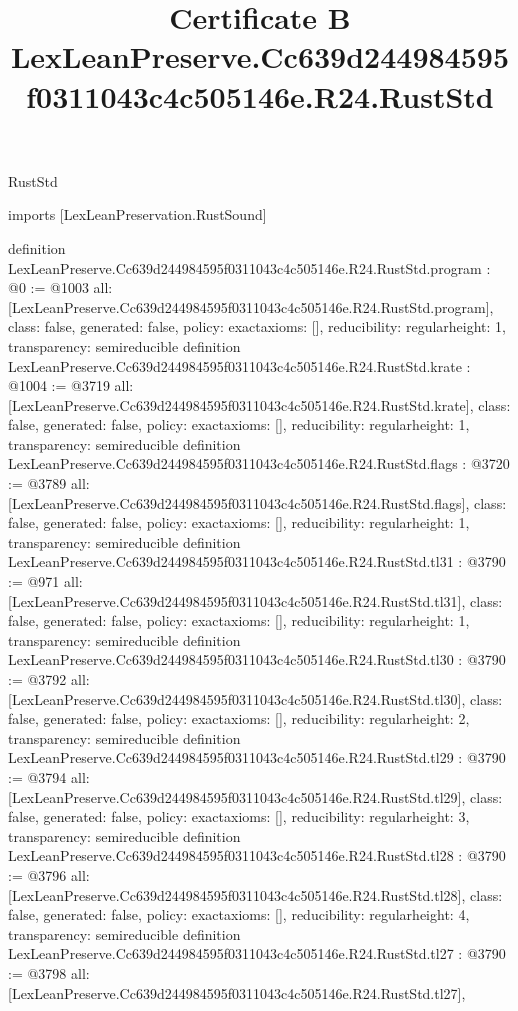 \begin{lexlean}{RustStd}
\title{Certificate B LexLeanPreserve.Cc639d244984595f0311043c4c505146e.R24.RustStd}
\begin{coremodule}
imports [LexLeanPreservation.RustSound]

definition LexLeanPreserve.Cc639d244984595f0311043c4c505146e.R24.RustStd.program : @0 := @1003 {
  all: [LexLeanPreserve.Cc639d244984595f0311043c4c505146e.R24.RustStd.program],
  class: false,
  generated: false,
  policy: exact{axioms: []},
  reducibility: regular{height: 1},
  transparency: semireducible
}
definition LexLeanPreserve.Cc639d244984595f0311043c4c505146e.R24.RustStd.krate : @1004 := @3719 {
  all: [LexLeanPreserve.Cc639d244984595f0311043c4c505146e.R24.RustStd.krate],
  class: false,
  generated: false,
  policy: exact{axioms: []},
  reducibility: regular{height: 1},
  transparency: semireducible
}
definition LexLeanPreserve.Cc639d244984595f0311043c4c505146e.R24.RustStd.flags : @3720 := @3789 {
  all: [LexLeanPreserve.Cc639d244984595f0311043c4c505146e.R24.RustStd.flags],
  class: false,
  generated: false,
  policy: exact{axioms: []},
  reducibility: regular{height: 1},
  transparency: semireducible
}
definition LexLeanPreserve.Cc639d244984595f0311043c4c505146e.R24.RustStd.tl31 : @3790 := @971 {
  all: [LexLeanPreserve.Cc639d244984595f0311043c4c505146e.R24.RustStd.tl31],
  class: false,
  generated: false,
  policy: exact{axioms: []},
  reducibility: regular{height: 1},
  transparency: semireducible
}
definition LexLeanPreserve.Cc639d244984595f0311043c4c505146e.R24.RustStd.tl30 : @3790 := @3792 {
  all: [LexLeanPreserve.Cc639d244984595f0311043c4c505146e.R24.RustStd.tl30],
  class: false,
  generated: false,
  policy: exact{axioms: []},
  reducibility: regular{height: 2},
  transparency: semireducible
}
definition LexLeanPreserve.Cc639d244984595f0311043c4c505146e.R24.RustStd.tl29 : @3790 := @3794 {
  all: [LexLeanPreserve.Cc639d244984595f0311043c4c505146e.R24.RustStd.tl29],
  class: false,
  generated: false,
  policy: exact{axioms: []},
  reducibility: regular{height: 3},
  transparency: semireducible
}
definition LexLeanPreserve.Cc639d244984595f0311043c4c505146e.R24.RustStd.tl28 : @3790 := @3796 {
  all: [LexLeanPreserve.Cc639d244984595f0311043c4c505146e.R24.RustStd.tl28],
  class: false,
  generated: false,
  policy: exact{axioms: []},
  reducibility: regular{height: 4},
  transparency: semireducible
}
definition LexLeanPreserve.Cc639d244984595f0311043c4c505146e.R24.RustStd.tl27 : @3790 := @3798 {
  all: [LexLeanPreserve.Cc639d244984595f0311043c4c505146e.R24.RustStd.tl27],
}
\end{coremodule}
\end{lexlean}
